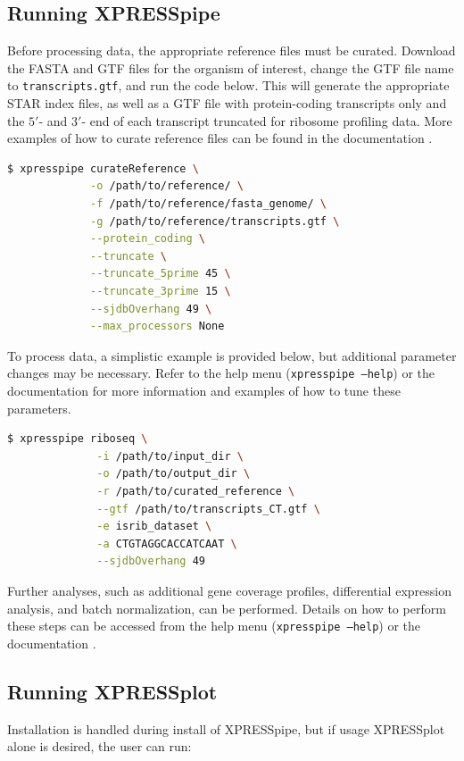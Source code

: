 \documentclass[10pt, oneside]{article}
\begin{document}
\begin{multicols}{2}
\subsection*{Running XPRESSpipe}
Before processing data, the appropriate reference files must be curated. Download the FASTA and GTF files for the organism of interest, change the GTF file name to \texttt{transcripts.gtf}, and run the code below. This will generate the appropriate STAR index files, as well as a GTF file with protein-coding transcripts only and the $5'$- and $3'$- end of each transcript truncated for ribosome profiling data. More examples of how to curate reference files can be found in the documentation \cite{xpresspipe_docs}.

\begin{lstlisting}[language=bash, caption=curateReference example]
$ xpresspipe curateReference \
             -o /path/to/reference/ \
             -f /path/to/reference/fasta_genome/ \
             -g /path/to/reference/transcripts.gtf \
             --protein_coding \
             --truncate \
             --truncate_5prime 45 \
             --truncate_3prime 15 \
             --sjdbOverhang 49 \
             --max_processors None
\end{lstlisting}

To process data, a simplistic example is provided below, but additional parameter changes may be necessary. Refer to the help menu (\texttt{xpresspipe --help}) or the documentation \cite{xpresspipe_docs} for more information and examples of how to tune these parameters.

\begin{lstlisting}[language=bash, caption=riboseq pipeline example]
$ xpresspipe riboseq \
              -i /path/to/input_dir \
              -o /path/to/output_dir \
              -r /path/to/curated_reference \
              --gtf /path/to/transcripts_CT.gtf \
              -e isrib_dataset \
              -a CTGTAGGCACCATCAAT \
              --sjdbOverhang 49
\end{lstlisting}

Further analyses, such as additional gene coverage profiles, differential expression analysis, and batch normalization, can be performed. Details on how to perform these steps can be accessed from the help menu (\texttt{xpresspipe --help}) or the documentation \cite{xpresspipe_docs}.

\subsection*{Running XPRESSplot}
Installation is handled during install of XPRESSpipe, but if usage XPRESSplot alone is desired, the user can run:


\end{multicols}
\end{document}

